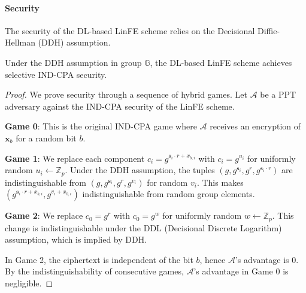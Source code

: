 \paragraph{Security}
The security of the DL-based LinFE scheme relies on the Decisional Diffie-Hellman (DDH) assumption.

\begin{thm}
Under the DDH assumption in group $\mathbb{G}$, the DL-based LinFE scheme achieves selective IND-CPA security.
\end{thm}

\begin{proof}
We prove security through a sequence of hybrid games. Let $\mathcal{A}$ be a PPT adversary against the IND-CPA security of the LinFE scheme.

\textbf{Game 0}: This is the original IND-CPA game where $\mathcal{A}$ receives an encryption of $\mathbf{x}_b$ for a random bit $b$.

\textbf{Game 1}: We replace each component $c_i = g^{\mathbf{s}_i \cdot r + x_{b,i}}$ with $c_i = g^{u_i}$ for uniformly random $u_i \leftarrow \mathbb{Z}_p$. Under the DDH assumption, the tuples $(g, g^{\mathbf{s}_i}, g^r, g^{\mathbf{s}_i \cdot r})$ are indistinguishable from $(g, g^{\mathbf{s}_i}, g^r, g^{v_i})$ for random $v_i$. This makes $(g^{\mathbf{s}_i \cdot r + x_{b,i}}, g^{v_i + x_{b,i}})$ indistinguishable from random group elements.

\textbf{Game 2}: We replace $c_0 = g^r$ with $c_0 = g^w$ for uniformly random $w \leftarrow \mathbb{Z}_p$. This change is indistinguishable under the DDL (Decisional Discrete Logarithm) assumption, which is implied by DDH.

In Game 2, the ciphertext is independent of the bit $b$, hence $\mathcal{A}$'s advantage is 0. By the indistinguishability of consecutive games, $\mathcal{A}$'s advantage in Game 0 is negligible.
\end{proof}


